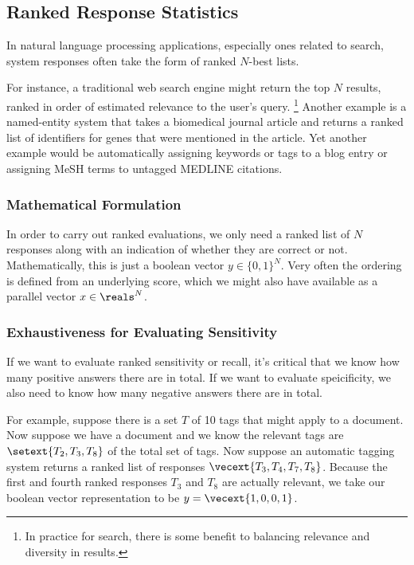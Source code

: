 \subsection{Ranked Response Statistics}

In natural language processing applications, especially ones related
to search, system responses often take the form of ranked $N$-best
lists.  

For instance, a traditional web search engine might return the
top $N$ results, ranked in order of estimated relevance to the user's
query.%
%
\footnote{In practice for search, there is some benefit to balancing
  relevance and diversity in results.}
%
Another example is a named-entity system that takes a biomedical
journal article and returns a ranked list of identifiers for genes
that were mentioned in the article.  Yet another example would be
automatically assigning keywords or tags to a blog entry or assigning
MeSH terms to untagged MEDLINE citations.

\subsubsection{Mathematical Formulation}

In order to carry out ranked evaluations, we only need a ranked list
of $N$ responses along with an indication of whether they are correct
or not.  Mathematically, this is just a boolean vector $y \in \{ 0, 1
\}^N$.  Very often the ordering is defined from an underlying score,
which we might also have available as a parallel vector $x \in
\reals^N$.

\subsubsection{Exhaustiveness for Evaluating Sensitivity}

If we want to evaluate ranked sensitivity or recall, it's critical
that we know how many positive answers there are in total.  If we want
to evaluate speicificity, we also need to know how many negative
answers there are in total.

For example, suppose there is a set $T$ of 10 tags that might apply to
a document.  Now suppose we have a document and we know the relevant
tags are $\setext{T_2, T_3, T_8}$ of the total set of tags.  Now
suppose an automatic tagging system returns a ranked list of responses
$\vecext{T_3, T_4, T_7, T_8}$.  Because the first and fourth ranked
responses $T_3$ and $T_8$ are actually relevant, we take our boolean
vector representation to be $y = \vecext{1, 0, 0, 1}$.  

